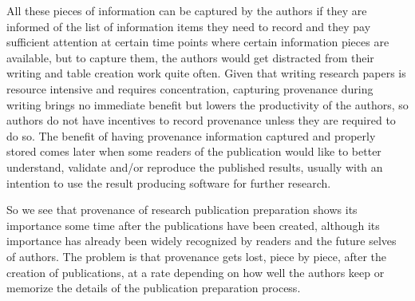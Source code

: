 All these pieces of information can be captured by the authors if they are informed of the list of information items they need to record and they pay sufficient attention at certain time points where certain information pieces are available, but to capture them, the authors would get distracted from their writing and table creation work quite often. Given that writing research papers is resource intensive and requires concentration, capturing provenance during writing brings no immediate benefit but lowers the productivity of the authors, so authors do not have incentives to record provenance unless they are required to do so. The benefit of having provenance information captured and properly stored comes later when some readers of the publication would like to better understand, validate and/or reproduce the published results, usually with an intention to use the result producing software for further research.

So we see that provenance of research publication preparation shows its importance some time after the publications have been created, although its importance has already been widely recognized by readers and the future selves of authors. The problem is that provenance gets lost, piece by piece, after the creation of publications, at a rate depending on how well the authors keep or memorize the details of the publication preparation process.

